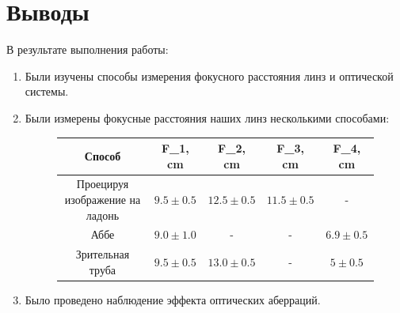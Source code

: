 \documentclass{article}
\begin{document}
\section{Выводы}
В результате выполнения работы:
\begin{enumerate}
  \item Были изучены способы измерения фокусного расстояния линз и оптической системы.
  \item Были измерены фокусные расстояния наших линз несколькими способами: 
  \begin{figure}[H]
    \centering
    \begin{tabular}{|c|c|c|c|c|}
      \hline
      Способ & F_1, cm & F_2, cm & F_3, cm & F_4, cm \\\hline
      Проецируя изображение на ладонь   & \(9.5 \pm 0.5\) & \(12.5 \pm 0.5\) & \(11.5\pm 0.5\) & - \\\hline
      Аббе     & \(9.0 \pm 1.0\) & - & - &\(6.9 \pm 0.5\) \\\hline
      Зрительная труба & \(9.5 \pm 0.5\) & \(13.0 \pm 0.5\) & - &\(5 \pm 0.5\) \\\hline
    \end{tabular}
  \end{figure}
  \item Было проведено наблюдение эффекта оптических аберраций.
\end{enumerate}
\end{document}
